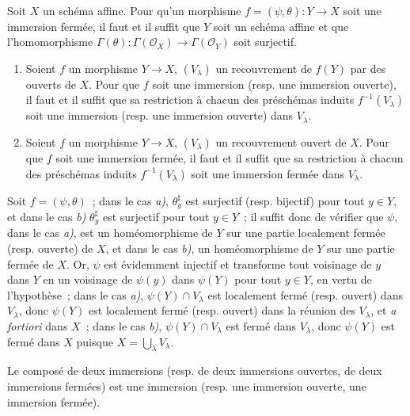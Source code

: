 \begin{corollary}[4.2.3]
\label{I.4.2.3-fr}
Soit $X$ un schéma affine. Pour qu'un morphisme
$f=(\psi,\theta):Y\to X$ soit une immersion fermée, il faut et il suffit que
$Y$ soit un schéma affine et que l'homomorphisme
$\Gamma(\theta):\Gamma(\mathscr{O}_X)\to\Gamma(\mathscr{O}_Y)$ soit surjectif.
\end{corollary}

\begin{corollary}[4.2.4]
\label{I.4.2.4-fr}
\begin{enumerate}
  \item[\textup{a)}] Soient $f$ un morphisme $Y\to X$, $(V_\lambda)$ un recouvrement
  de $f(Y)$ par des ouverts de $X$. Pour que $f$ soit une immersion (\textup{resp.} une
  immersion ouverte), il faut et il suffit
  que sa restriction à chacun des préschémas induits $f^{-1}(V_\lambda)$ soit
  une immersion (\textup{resp.} une immersion ouverte) dans $V_\lambda$.
  \item[\textup{b)}] Soient $f$ un morphisme $Y\to X$, $(V_\lambda)$ un recouvrement
  ouvert de $X$. Pour que $f$ soit une immersion fermée, il faut et il suffit
  que sa restriction à chacun des préschémas induits $f^{-1}(V_\lambda)$ soit
  une immersion fermée dans $V_\lambda$.
\end{enumerate}
\end{corollary}

Soit $f=(\psi,\theta)$~; dans le cas \emph{a)}, $\theta_y^\sharp$ est surjectif
(resp. bijectif) pour tout $y\in Y$, et dans le cas \emph{b)} $\theta_y^\sharp$ est
surjectif pour tout $y\in Y$~; il suffit donc de vérifier que $\psi$, dans le
cas \emph{a)}, est un homéomorphisme de $Y$ sur une partie localement fermée (resp.
ouverte) de $X$, et dans le cas \emph{b)}, un homéomorphisme de $Y$ sur une partie
fermée de $X$. Or, $\psi$ est évidemment injectif et transforme tout voisinage
de $y$ dans $Y$ en un voisinage de $\psi(y)$ dans $\psi(Y)$ pour tout $y\in Y$,
en vertu de l'hypothèse~; dans le cas \emph{a)}, $\psi(Y)\cap V_\lambda$ est localement
fermé (resp. ouvert) dans $V_\lambda$, donc $\psi(Y)$ est localement fermé
(resp. ouvert) dans la réunion des $V_\lambda$, et \emph{a fortiori} dans $X$~;
dans le cas \emph{b)}, $\psi(Y)\cap V_\lambda$ est fermé dans $V_\lambda$, donc
$\psi(Y)$ est fermé dans $X$ puisque $X=\bigcup_\lambda V_\lambda$.

\begin{proposition}[4.2.5]
\label{I.4.2.5-fr}
Le composé de deux immersions (\textup{resp.} de deux immersions ouvertes, de deux
immersions fermées) est une immersion (\textup{resp.} une immersion ouverte, une
immersion fermée).
\end{proposition}

